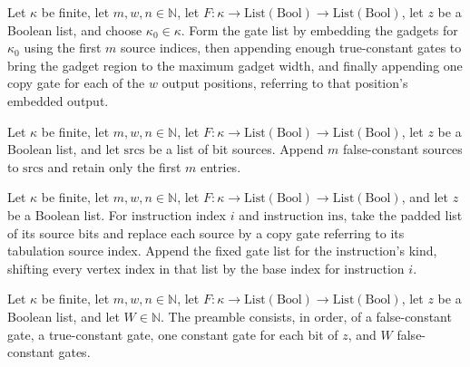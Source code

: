 \begin{definition}
\label{BoolCircuit.tabFixed}
\leanok
{}
Let $\kappa$ be finite, let $m,w,n\in\mathbb{N}$, let
$F:\kappa\to\mathrm{List}(\mathrm{Bool})\to\mathrm{List}(\mathrm{Bool})$, let $z$ be a
Boolean list, and choose $\kappa_0\in\kappa$. Form the gate list by embedding the
gadgets for $\kappa_0$ using the first $m$ source indices, then appending enough
true-constant gates to bring the gadget region to the maximum gadget width, and finally
appending one copy gate for each of the $w$ output positions, referring to that
position's embedded output.
\end{definition}

\begin{definition}
\label{BoolCircuit.padSrc}
\leanok
{}
Let $\kappa$ be finite, let $m,w,n\in\mathbb{N}$, let
$F:\kappa\to\mathrm{List}(\mathrm{Bool})\to\mathrm{List}(\mathrm{Bool})$, let $z$ be a
Boolean list, and let $\mathrm{srcs}$ be a list of bit sources. Append $m$
false-constant sources to $\mathrm{srcs}$ and retain only the first $m$ entries.
\end{definition}

\begin{definition}
\label{BoolCircuit.tabInstrGates}
\leanok
{}
Let $\kappa$ be finite, let $m,w,n\in\mathbb{N}$, let
$F:\kappa\to\mathrm{List}(\mathrm{Bool})\to\mathrm{List}(\mathrm{Bool})$, and let $z$ be
a Boolean list. For instruction index $i$ and instruction $\mathrm{ins}$, take the
padded list of its source bits and replace each source by a copy gate referring to its
tabulation source index. Append the fixed gate list for the instruction's kind, shifting
every vertex index in that list by the base index for instruction $i$.
\end{definition}

\begin{definition}
\label{BoolCircuit.tabPre}
\leanok
{}
Let $\kappa$ be finite, let $m,w,n\in\mathbb{N}$, let
$F:\kappa\to\mathrm{List}(\mathrm{Bool})\to\mathrm{List}(\mathrm{Bool})$, let $z$ be a
Boolean list, and let $W\in\mathbb{N}$. The preamble consists, in order, of a
false-constant gate, a true-constant gate, one constant gate for each bit of $z$, and
$W$ false-constant gates.
\end{definition}

